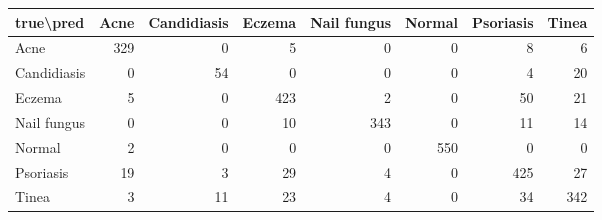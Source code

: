 \begin{tabular}{lrrrrrrr}
\toprule
true\textbackslash pred & Acne & Candidiasis & Eczema & Nail fungus & Normal & Psoriasis & Tinea \\
\midrule
Acne & 329 & 0 & 5 & 0 & 0 & 8 & 6 \\
Candidiasis & 0 & 54 & 0 & 0 & 0 & 4 & 20 \\
Eczema & 5 & 0 & 423 & 2 & 0 & 50 & 21 \\
Nail fungus & 0 & 0 & 10 & 343 & 0 & 11 & 14 \\
Normal & 2 & 0 & 0 & 0 & 550 & 0 & 0 \\
Psoriasis & 19 & 3 & 29 & 4 & 0 & 425 & 27 \\
Tinea & 3 & 11 & 23 & 4 & 0 & 34 & 342 \\
\bottomrule
\end{tabular}
